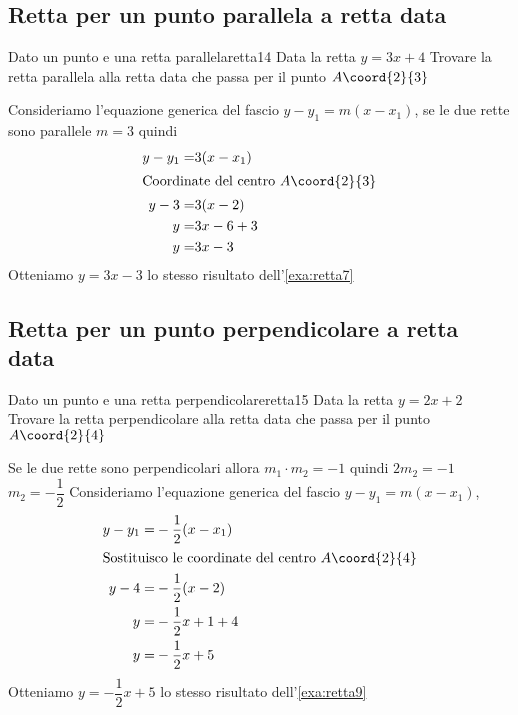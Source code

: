 \subsection{Retta per un punto parallela a retta data}
\begin{esempiot}{Dato un punto e una retta parallela}{retta14}
	Data la retta $y=3x+4$ Trovare la retta parallela alla retta data che  passa per il punto	$A\coord{2}{3}$
\end{esempiot}
Consideriamo l'equazione generica del fascio $y-y_1=m(x-x_1)$, se le due rette sono parallele $m=3$ quindi
\begin{align*}
	y-y_1=&3(x-x_1)\\
	\intertext{Coordinate del centro $A\coord{2}{3}$}
	y-3=&3(x-2)\\
	y=&3x-6+3\\
	y=&3x-3\\
\end{align*}
Otteniamo 	$y=3x-3$ lo stesso risultato dell'\cref{exa:retta7}
\subsection{Retta per un punto perpendicolare a retta data}
\begin{esempiot}{Dato un punto e una retta perpendicolare}{retta15}
	Data la retta $y=2x+2$ Trovare la retta perpendicolare alla retta data che  passa per il punto	$A\coord{2}{4}$
\end{esempiot}
Se le due rette sono perpendicolari allora $m_1\cdot m_2=-1$ quindi $2m_2=-1$ $m_2=-\dfrac{1}{2}$
Consideriamo l'equazione generica del fascio $y-y_1=m(x-x_1)$, 
\begin{align*}
	y-y_1=&-\dfrac{1}{2}(x-x_1)\\
	\intertext{Sostituisco le coordinate del centro $A\coord{2}{4}$}
	y-4=&-\dfrac{1}{2}(x-2)\\
	y=&-\dfrac{1}{2}x+1+4\\
	y=&-\dfrac{1}{2}x+5\\
\end{align*}
Otteniamo 	$y=-\dfrac{1}{2}x+5$ lo stesso risultato dell'\cref{exa:retta9}
